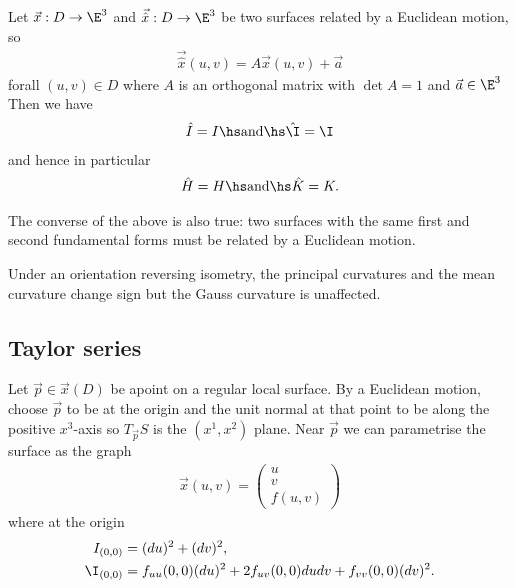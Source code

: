 \documentclass{article}
\begin{document}
\begin{theorem}[Notes 9.7]
	Let $\vec x: D\to\E^3$ and $\vec{\hat x}:D\to\E^3$ be two surfaces related by a
	Euclidean motion, so
	\begin{align*}
		\vec{\hat x} (u,v) = A\vec x(u,v)+\vec a
	\end{align*}
	forall $(u,v)\in D$ where $A$ is an orthogonal matrix with $\det A=1$ and $\vec a\in\E^3$
	Then we have
	\begin{align*}
		\hat I = I \hs \text{and} \hs \hat\I = \I
	\end{align*}
	and hence in particular
	\begin{align*}
		\hat H = H \hs \text{and} \hs \hat K = K.
	\end{align*}
\end{theorem}

\begin{theorem}
	The converse of the above is also true: two surfaces with the same first and second
	fundamental forms must be related by a Euclidean motion.
\end{theorem}

\begin{proposition}[Notes 9.9]
	Under an orientation reversing isometry, the principal curvatures and the mean curvature
	change sign but the Gauss curvature is unaffected.
\end{proposition}

\subsection{Taylor series}

\begin{proposition}[Notes 9.10]
	Let $\vec p \in \vec x(D)$ be apoint on a regular local surface. By a Euclidean motion,
	choose $\vec p$ to be at the origin and the unit normal at that point to be along the positive
	$x^3$-axis so $T_{\vec p}S$ is the $(x^1,x^2)$ plane. Near $\vec p$ we can parametrise
	the surface as the graph
	\begin{align*}
		\vec x(u,v)=\begin{pmatrix}
			            u \\ v \\ f(u,v)
		            \end{pmatrix}
	\end{align*}
	where at the origin
	\begin{align*}
		I_{(0,0)}  & =(du)^2+(dv)^2,                                        \\
		\I_{(0,0)} & =f_{uu}(0,0)(du)^2+2f_{uv}(0,0)dudv+f_{vv}(0,0)(dv)^2.
	\end{align*}
\end{proposition}
\end{document}
